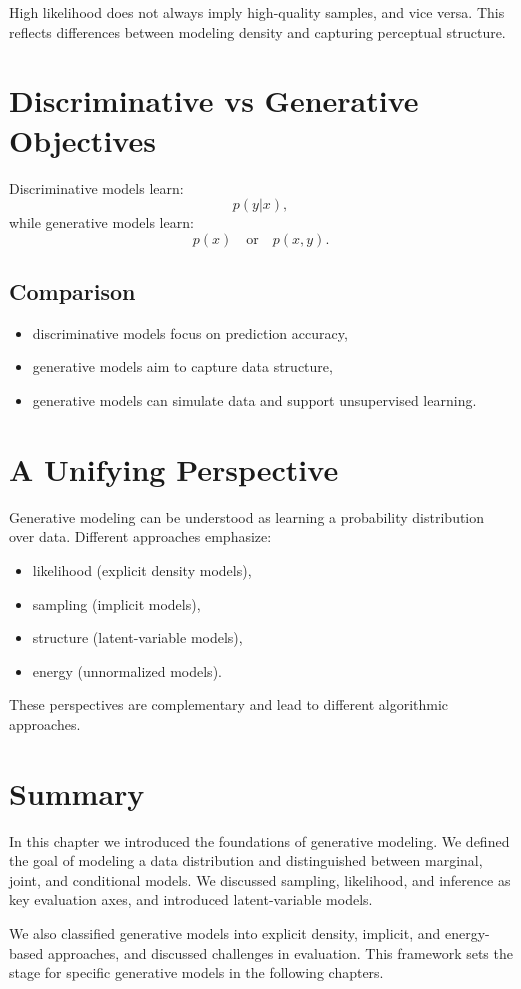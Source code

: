 High likelihood does not always imply high-quality samples, and vice versa. This reflects differences between modeling density and capturing perceptual structure.

\section{Discriminative vs Generative Objectives}

Discriminative models learn:
\[
p(y|x),
\]
while generative models learn:
\[
p(x) \quad \text{or} \quad p(x,y).
\]

\subsection{Comparison}

\begin{itemize}
    \item discriminative models focus on prediction accuracy,
    \item generative models aim to capture data structure,
    \item generative models can simulate data and support unsupervised learning.
\end{itemize}

\section{A Unifying Perspective}

Generative modeling can be understood as learning a probability distribution over data. Different approaches emphasize:
\begin{itemize}
    \item likelihood (explicit density models),
    \item sampling (implicit models),
    \item structure (latent-variable models),
    \item energy (unnormalized models).
\end{itemize}

These perspectives are complementary and lead to different algorithmic approaches.

\section{Summary}

In this chapter we introduced the foundations of generative modeling. We defined the goal of modeling a data distribution and distinguished between marginal, joint, and conditional models. We discussed sampling, likelihood, and inference as key evaluation axes, and introduced latent-variable models.

We also classified generative models into explicit density, implicit, and energy-based approaches, and discussed challenges in evaluation. This framework sets the stage for specific generative models in the following chapters.